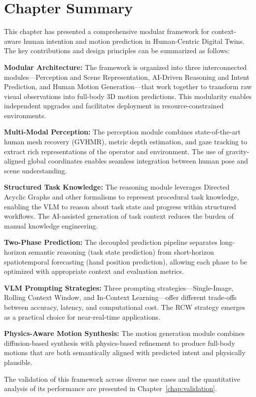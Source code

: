 \section{Chapter Summary}
\label{sec:chapter_summary}

This chapter has presented a comprehensive modular framework for context-aware human intention and motion prediction in Human-Centric Digital Twins. The key contributions and design principles can be summarized as follows:

\textbf{Modular Architecture:} The framework is organized into three interconnected modules---Perception and Scene Representation, AI-Driven Reasoning and Intent Prediction, and Human Motion Generation---that work together to transform raw visual observations into full-body 3D motion predictions. This modularity enables independent upgrades and facilitates deployment in resource-constrained environments.

\textbf{Multi-Modal Perception:} The perception module combines state-of-the-art human mesh recovery (GVHMR), metric depth estimation, and gaze tracking to extract rich representations of the operator and environment. The use of gravity-aligned global coordinates enables seamless integration between human pose and scene understanding.

\textbf{Structured Task Knowledge:} The reasoning module leverages Directed Acyclic Graphs and other formalisms to represent procedural task knowledge, enabling the VLM to reason about task state and progress within structured workflows. The AI-assisted generation of task context reduces the burden of manual knowledge engineering.

\textbf{Two-Phase Prediction:} The decoupled prediction pipeline separates long-horizon semantic reasoning (task state prediction) from short-horizon spatiotemporal forecasting (hand position prediction), allowing each phase to be optimized with appropriate context and evaluation metrics.

\textbf{VLM Prompting Strategies:} Three prompting strategies---Single-Image, Rolling Context Window, and In-Context Learning---offer different trade-offs between accuracy, latency, and computational cost. The RCW strategy emerges as a practical choice for near-real-time applications.

\textbf{Physics-Aware Motion Synthesis:} The motion generation module combines diffusion-based synthesis with physics-based refinement to produce full-body motions that are both semantically aligned with predicted intent and physically plausible.

The validation of this framework across diverse use cases and the quantitative analysis of its performance are presented in Chapter~\ref{chap:validation}.